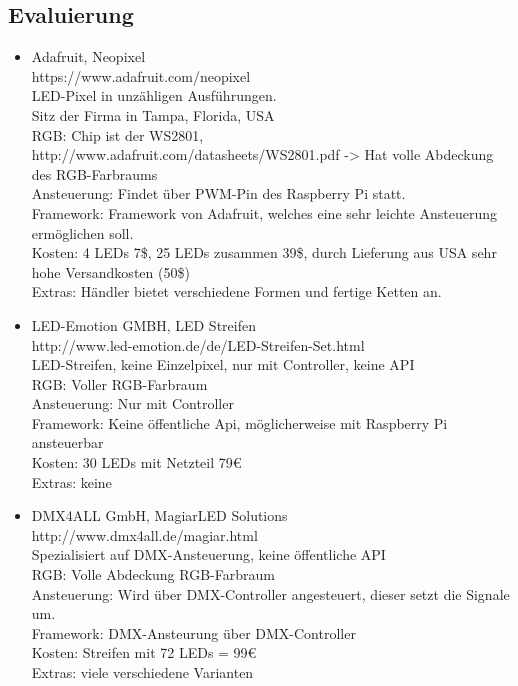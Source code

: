 \subsection{Evaluierung}
\begin{itemize}
\item Adafruit, Neopixel \\
https://www.adafruit.com/neopixel \\
LED-Pixel in unzähligen Ausführungen. \\
Sitz der Firma in Tampa, Florida, USA \\
RGB: Chip ist der WS2801, http://www.adafruit.com/datasheets/WS2801.pdf -> Hat volle Abdeckung des RGB-Farbraums \\
Ansteuerung: Findet über PWM-Pin des Raspberry Pi statt. \\
Framework: Framework von Adafruit, welches eine sehr leichte Ansteuerung ermöglichen soll. \\
Kosten: 4 LEDs  7\$, 25 LEDs zusammen  39\$, durch Lieferung aus USA sehr hohe Versandkosten (50\$) \\
Extras: Händler bietet verschiedene Formen und fertige Ketten an. \\
\item LED-Emotion GMBH, LED Streifen \\
http://www.led-emotion.de/de/LED-Streifen-Set.html \\
LED-Streifen, keine Einzelpixel, nur mit Controller, keine API \\
RGB: Voller RGB-Farbraum \\
Ansteuerung: Nur mit Controller  \\
Framework: Keine öffentliche Api, möglicherweise mit Raspberry Pi ansteuerbar  \\
Kosten: 30 LEDs mit Netzteil 79€   \\
Extras: keine
\item DMX4ALL GmbH, MagiarLED Solutions \\
http://www.dmx4all.de/magiar.html \\
Spezialisiert auf DMX-Ansteuerung, keine öffentliche API \\
RGB: Volle Abdeckung RGB-Farbraum \\
Ansteuerung: Wird über DMX-Controller angesteuert, dieser setzt die Signale um. \\
Framework: DMX-Ansteurung über DMX-Controller \\
Kosten: Streifen mit 72 LEDs = 99€ \\
Extras: viele verschiedene Varianten

\end{itemize}
